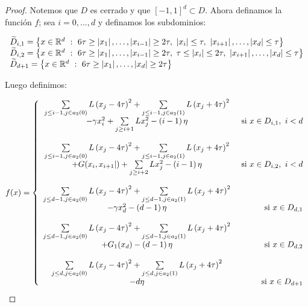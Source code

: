 \begin{proof}
	Notemos que $D$ es cerrado y que $[-1,1]^d \subset D$. Ahora definamos la funci\'on $f$; sea $i = 0 , \dots, d$ y definamos los subdominios:
	
	\begin{equation*}
		\begin{array}{l}
		\widetilde{D}_{i,1} = \sett{x \in \R^d \tq 6\tau \geq \abs{x_1}, \dots, \abs{x_{i-1}} \geq 2\tau,\ \abs{x_i} \leq \tau,\ \abs{x_{i+1}}, \dots, \abs{x_d} \leq \tau} \\
		\widetilde{D}_{i,2} = \sett{x \in \R^d \tq 6\tau \geq \abs{x_1}, \dots, \abs{x_{i-1}} \geq 2\tau,\ \tau \leq \abs{x_i} \leq 2\tau,\ \abs{x_{i+1}}, \dots, \abs{x_d} \leq \tau} \\
		\widetilde{D}_{d+1} = \sett{x \in \R^d \tq 6\tau \geq \abs{x_1}, \dots, \abs{x_{d}} \geq 2\tau}
		\end{array}
	\end{equation*}
	
	Luego definimos:
	
	\begin{equation*}
	f(x) = \left\lbrace \begin{array}{cr}
	\sum\limits_{j \leq i-1, j \in a_2(0)}{L \left(x_j - 4\tau\right)^2} + \sum\limits_{j \leq i-1, j \in a_2(1)}{L \left(x_j + 4\tau\right)^2} & \\
	- \gamma x_i^2 + \sum\limits_{j \geq i+1}{L x_j^2} - \left(i-1\right)\eta & \text{ si } x \in D_{i,1} ,\ i< d\\
	& \\
	\sum\limits_{j \leq i-1, j \in a_2(0)}{L \left(x_j - 4\tau\right)^2} + \sum\limits_{j \leq i-1, j \in a_2(1)}{L \left(x_j + 4\tau\right)^2} & \\
	+ G(x_i, x_{i+1}|) + \sum\limits_{j \geq i+2}{L x_j^2} - \left(i-1\right)\eta & \text{ si } x \in D_{i,2} ,\ i< d \\
	& \\
	\sum\limits_{j \leq d-1, j \in a_2(0)}{L \left(x_j - 4\tau\right)^2} + \sum\limits_{j \leq d-1, j \in a_2(1)}{L \left(x_j + 4\tau\right)^2} & \\
	- \gamma x_d^2 - \left(d-1\right)\eta & \text{ si } x \in D_{d,1} \\
	& \\
	\sum\limits_{j \leq d-1, j \in a_2(0)}{L \left(x_j - 4\tau\right)^2} + \sum\limits_{j \leq d-1, j \in a_2(1)}{L \left(x_j + 4\tau\right)^2} & \\
	+ G_1(x_d) - \left(d-1\right)\eta & \text{ si } x \in D_{d,2} \\
	& \\
	\sum\limits_{j \leq d, j \in a_2(0)}{L \left(x_j - 4\tau\right)^2} + \sum\limits_{j \leq d, j \in a_2(1)}{L \left(x_j + 4\tau\right)^2} & \\
	- d\eta & \text{ si } x \in D_{d+1} \\
	\end{array} \right.
	\end{equation*}
	

\end{proof}
